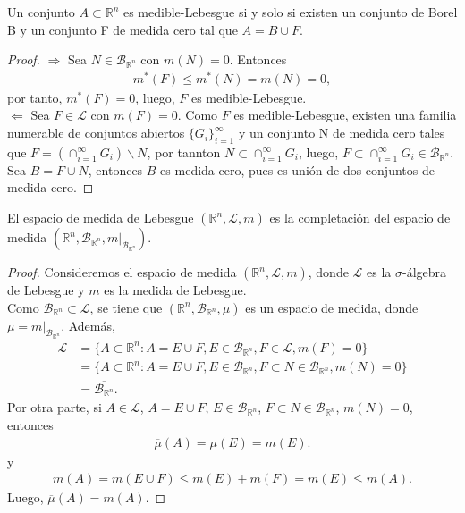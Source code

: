 \begin{cor}
Un conjunto $A \subset \mathbb{R}^n$ es medible-Lebesgue si y solo si existen un conjunto de Borel B y un conjunto F de medida cero tal que $A = B \cup F$.
\end{cor}

\begin{proof}
$\Longrightarrow$ Sea $N \in \mathcal{B}_{\mathbb{R}^n}$ con $m(N) = 0$. Entonces
\begin{align*}
    m^*(F) \leq m^*(N) = m(N) = 0,
\end{align*}
por tanto, $m^*(F) = 0$, luego, $F$ es medible-Lebesgue.
\\
\newline
$\Longleftarrow$ Sea $F \in \mathcal{L}$ con $m(F) = 0$. Como $F$ es medible-Lebesgue, existen una familia numerable de conjuntos abiertos $\{G_i\}_{i=1}^{\infty}$ y un conjunto N de medida cero tales que $F = (\cap_{i=1}^{\infty}{G_i}) \backslash N$, por tannton $N \subset \cap_{i=1}^{\infty}{G_i}$, luego, $F \subset \cap_{i=1}^{\infty}{G_i} \in \mathcal{B}_{\mathbb{R}^n}$. Sea $B = F \cup N$, entonces $B$ es medida cero, pues es unión de dos conjuntos de medida cero.
\end{proof}

\begin{cor}
El espacio de medida de Lebesgue $(\mathbb{R}^n, \mathcal{L}, m)$ es la completación del espacio de medida $(\mathbb{R}^n, \mathcal{B}_{\mathbb{R}^n}, m|_{\mathcal{B}_{\mathbb{R}^n}})$.
\end{cor}

\begin{proof}
Consideremos el espacio de medida $(\mathbb{R}^n, \mathcal{L}, m)$, donde $\mathcal{L}$ es la $\sigma$-álgebra de Lebesgue y $m$ es la medida de Lebesgue.
\\
\newline
Como $\mathcal{B}_{\mathbb{R}^n} \subset \mathcal{L}$, se tiene que $(\mathbb{R}^n, \mathcal{B}_{\mathbb{R}^n}, \mu)$ es un espacio de medida, donde $\mu =  m|_{\mathcal{B}_{\mathbb{R}^n}}$. Además,
\begin{align*}
    \mathcal{L} &= \{ A \subset \mathbb{R}^n : A = E \cup F, E \in \mathcal{B}_{\mathbb{R}^n}, F \in \mathcal{L}, m(F) = 0\}\\
    & = \{ A \subset \mathbb{R}^n : A = E \cup F, E \in \mathcal{B}_{\mathbb{R}^n}, F \subset N \in \mathcal{B}_{\mathbb{R}^n}, m(N) = 0\} \\
    &= \overline{\mathcal{B}_{\mathbb{R}^n}}.
\end{align*}
Por otra parte, si $A \in \mathcal{L}$, $A = E \cup F$, $E \in \mathcal{B}_{\mathbb{R}^n}$, $F \subset N \in \mathcal{B}_{\mathbb{R}^n}$, $m(N) = 0$, entonces
\begin{align*}
    \overline{\mu}(A) = \mu(E) = m(E). 
\end{align*}
y
\begin{align*}
    m(A) = m(E \cup F) \leq m(E) + m(F) = m(E) \leq m(A).
\end{align*}
Luego, $\overline{\mu}(A) = m(A)$.
\end{proof}

